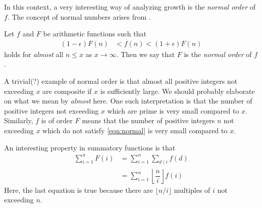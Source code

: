 \documentclass[elemannt.tex]{subfile}
\begin{document}
	In this context, a very interesting way of analyzing growth is the \textit{normal order} of $f$. The concept of normal numbers arises from \textcite{hardy_aiyangar_1917}.
		\begin{definition}
			Let $f$ and $F$ be arithmetic functions such that
				\begin{align}
					(1-\epsilon)F(n) 
						& < f(n)<(1+\epsilon)F(n)\label{eqn:normal}
				\end{align}
			holds for \textit{almost} all $n\leq x$ as $x\to\infty$. Then we say that $F$ is the \textit{normal order} of $f$.
		\end{definition}
	A trivial(?) example of normal order is that almost all positive integers not exceeding $x$ are composite if $x$ is sufficiently large. We should probably elaborate on what we mean by \textit{almost} here. One such interpretation is that the number of positive integers not exceeding $x$ which are prime is very small compared to $x$. Similarly, $f$ is of order $F$ means that the number of positive integers $n$ not exceeding $x$ which do not satisfy \ref{eqn:normal} is very small compared to $x$.
	
	An interesting property in summatory functions is that
		\begin{align*}
			\sum_{i=1}^{n}F(i)
				& = \sum_{i=1}^{n}\sum_{d\mid i}f(d)\\
				& = \sum_{i=1}^{n}\left\lfloor{\dfrac{n}{i}}\right\rfloor f(i)
		\end{align*}
	Here, the last equation is true because there are $\lfloor{n/i}\rfloor$ multiples of $i$ not exceeding $n$.
\end{document}
